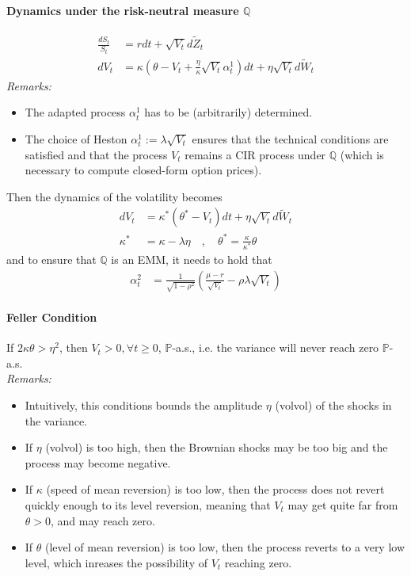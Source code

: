 \documentclass[a4paper,landscape,7pt,fleqn]{scrartcl}
\begin{document}
\begin{multicols*}{3}
\paragraph{Dynamics under the risk-neutral measure $\mathbb{Q}$}
\begin{align*}
\frac{dS_t}{S_t} &= r dt + \sqrt{V_t} d \tilde Z_t \\
dV_t &= \kappa \left(\theta - V_t + \frac{\eta}{\kappa} \sqrt{V_t} \alpha_t^1 \right) dt + \eta \sqrt{V_t} d \tilde W_t
\end{align*}
\textit{Remarks:}
\begin{itemize}
\item The adapted process $\alpha_t^1$ has to be (arbitrarily) determined.
\item The choice of Heston $\alpha_t^1 := \lambda \sqrt{V_t}$ ensures that the technical conditions are satisfied and that the process $V_t$ remains a CIR process under $\mathbb{Q}$ (which is necessary to compute closed-form option prices).
\end{itemize}
 Then the dynamics of the volatility becomes
\begin{align*}
dV_t &= \kappa^\ast (\theta^\ast - V_t) dt + \eta \sqrt{V_t} d \tilde W_t \\
\kappa^\ast &= \kappa - \lambda \eta \quad , \quad \theta^\ast = \frac{\kappa}{\kappa^\ast} \theta
\end{align*}
and to ensure that $\mathbb{Q}$ is an EMM, it needs to hold that
\begin{align*}
\alpha_t^2 &= \frac{1}{\sqrt{1-\rho^2}} \left( \frac{\mu-r}{\sqrt{V_t}} - \rho \lambda \sqrt{V_t} \right)
\end{align*}

\paragraph{Feller Condition}
If $2 \kappa \theta > \eta^2$, then $V_t > 0, \forall t \geq 0$, $\mathbb{P}$-a.s., i.e. the variance will never reach zero $\mathbb{P}$-a.s. \\
\textit{Remarks:}
\begin{itemize}
\item Intuitively, this conditions bounds the amplitude $\eta$ (volvol) of the shocks in the variance.
\item If $\eta$ (volvol) is too high, then the Brownian shocks may be too big and the process may become negative.
\item If $\kappa$ (speed of mean reversion) is too low, then the process does not revert quickly enough to its level reversion, meaning that $V_t$ may get quite far from $\theta >0$, and may reach zero.
\item If $\theta$ (level of mean reversion) is too low, then the process reverts to a very low level, which inreases the possibility of $V_t$ reaching zero.
\end{itemize}


\end{multicols*}
\end{document}
